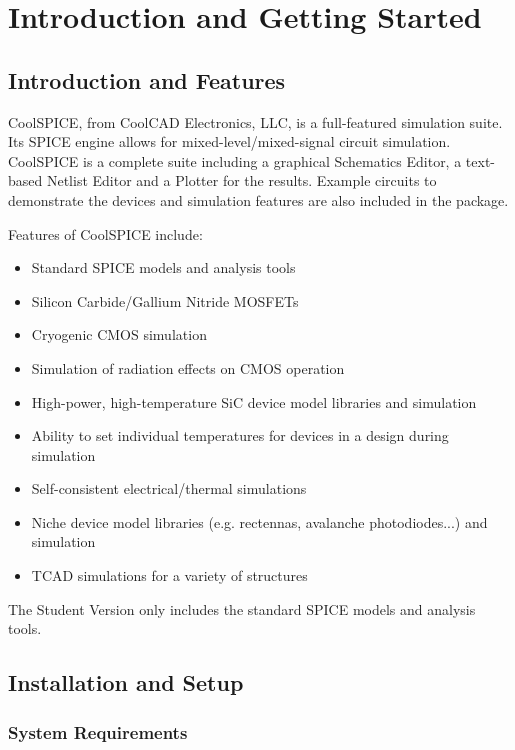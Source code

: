 \chapter{Introduction and Getting Started}

\section{Introduction and Features}

CoolSPICE, from CoolCAD Electronics, LLC, is a full-featured simulation suite.  Its SPICE engine allows for mixed-level/mixed-signal circuit simulation. CoolSPICE is a complete suite including a graphical Schematics Editor, a text-based Netlist Editor and a Plotter for the results. Example circuits to demonstrate the devices and simulation features are also included in the package.

Features of CoolSPICE include:

\begin{itemize} 
	\item Standard SPICE models and analysis tools
	\item Silicon Carbide/Gallium Nitride MOSFETs
	\item Cryogenic CMOS simulation
	\item Simulation of radiation effects on CMOS operation
	\item High-power, high-temperature SiC device model libraries and simulation 
	\item Ability to set individual temperatures for devices in a design during simulation
	\item Self-consistent electrical/thermal simulations
	\item Niche device model libraries (e.g. rectennas, avalanche photodiodes...) and simulation	
	\item TCAD simulations for a variety of structures
\end{itemize}

The Student Version only includes the standard SPICE models and analysis tools.


\section{Installation and Setup}


\subsection{System Requirements}


